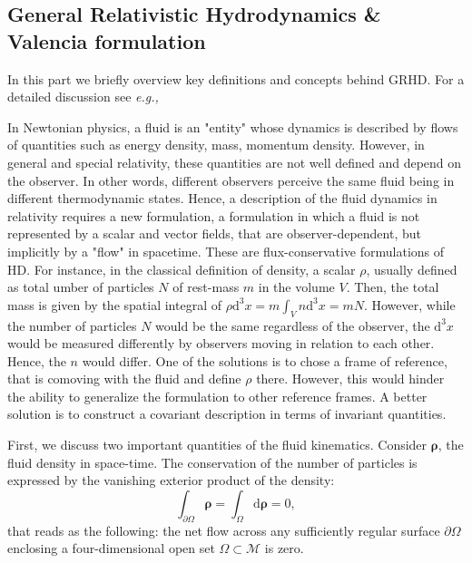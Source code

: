 
\subsection{General Relativistic Hydrodynamics \& Valencia formulation}



In this part we briefly overview key definitions and concepts behind \ac{GRHD}. 
For a detailed discussion see \textit{e.g.,} \citet{Misner:1973,Schutz:2009a,Gourgoulhon:2006bn,Andersson:2006nr,Rezzolla:2013}


In Newtonian physics, a fluid is an "entity" whose dynamics is described by flows of quantities 
such as energy density, mass, momentum density. However, in general and special relativity, these quantities 
are not well defined and depend on the observer. In other words, different observers perceive the same fluid 
being in different thermodynamic states. Hence, a description of the fluid dynamics in relativity requires 
a new formulation, a formulation in which a fluid is not represented by a scalar and vector fields, 
that are observer-dependent, but implicitly by a "flow" in spacetime. 
These are flux-conservative formulations of \ac{HD}.
%
For instance, in the classical definition of density, a scalar $\rho$, usually defined as 
total umber of particles $N$ of rest-mass $m$ in the volume $V$. 
Then, the total mass is given by the 
spatial integral of $\rho \text{d}^3x = m\int_V n \text{d}^3 x = mN$. 
%
However, while the number of particles $N$ would be the same regardless of the observer, 
the $\text{d}^3x$ would be measured differently by observers moving in relation to each other. 
Hence, the $n$ would differ. 
One of the solutions is to chose a frame of reference, that is comoving with the fluid and 
define $\rho$ there. However, this would hinder the ability to generalize the formulation 
to other reference frames.
A better solution is to construct a covariant description in terms of invariant quantities.


First, we discuss two important quantities of the fluid kinematics.
Consider $\boldsymbol{\rho}$, the fluid density in space-time. 
The conservation of the number of particles is expressed by the vanishing exterior product of the density: 
%
\begin{equation*}
\int_{\partial\Omega} \boldsymbol{\rho} = \int_{\Omega}\text{d}\boldsymbol{\rho} = 0,
\end{equation*}
%
that reads as the following: the net flow across any sufficiently regular 
surface $\partial\Omega$ enclosing a four-dimensional open set $\Omega\subset\mathcal{M}$ is zero.

